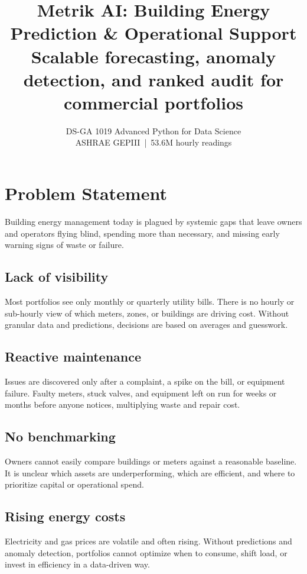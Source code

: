 \documentclass[11pt,a4paper]{article}
\title{\textbf{Metrik AI: Building Energy Prediction \& Operational Support}\\[0.4em]
\large Scalable forecasting, anomaly detection, and ranked audit for commercial portfolios}
\author{DS-GA 1019 Advanced Python for Data Science \\ ASHRAE GEPIII \,|\, 53.6M hourly readings}
\date{}
\begin{document}
\maketitle

\section{Problem Statement}

Building energy management today is plagued by systemic gaps that leave owners and operators flying blind, spending more than necessary, and missing early warning signs of waste or failure.

\subsection{Lack of visibility}
Most portfolios see only monthly or quarterly utility bills. There is no hourly or sub-hourly view of which meters, zones, or buildings are driving cost. Without granular data and predictions, decisions are based on averages and guesswork.

\subsection{Reactive maintenance}
Issues are discovered only after a complaint, a spike on the bill, or equipment failure. Faulty meters, stuck valves, and equipment left on run for weeks or months before anyone notices, multiplying waste and repair cost.

\subsection{No benchmarking}
Owners cannot easily compare buildings or meters against a reasonable baseline. It is unclear which assets are underperforming, which are efficient, and where to prioritize capital or operational spend.

\subsection{Rising energy costs}
Electricity and gas prices are volatile and often rising. Without predictions and anomaly detection, portfolios cannot optimize when to consume, shift load, or invest in efficiency in a data-driven way.
\end{document}
